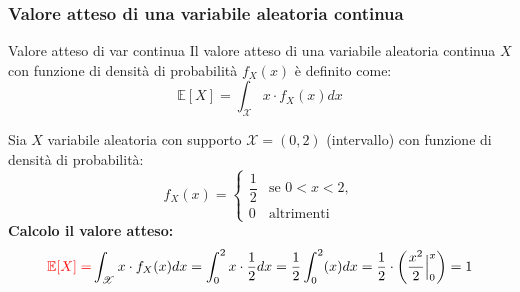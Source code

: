 \documentclass{article}  %
\theoremstyle{definition}
\begin{document}
\subsubsection{Valore atteso di una variabile aleatoria continua}
\begin{theorem}{Valore atteso di var continua}
	Il valore atteso di una variabile aleatoria continua $X$ con funzione di densità di probabilità $f_X(x)$ è definito come:
	\[
		\mathbb{E}[X]=\int_{\mathscr{X}}x \cdot f_X(x)dx
	\]
\end{theorem}
\begin{esercizio}[Esercizio]
	Sia $X$ variabile aleatoria con supporto $\mathscr{X}=(0,2)$ (intervallo) con funzione di densità di probabilità:
	\[
		f_X(x) =
		\begin{cases}
			\dfrac{1}{2} & \text{se } 0 < x < 2, \\[2mm]
			0            & \text{altrimenti}
		\end{cases}
	\]
	\textbf{Calcolo il valore atteso:}
	\[
		\textcolor{red}{\mathbb{E}[X]=}\int_{\mathscr{X}}x \cdot f_X(x)dx=\int_{0}^{2}x \cdot \frac{1}{2}dx=\frac{1}{2}\int_{0}^{2}(x)dx=\frac{1}{2}\cdot\left( \frac{x^2}{2}\Big|_{0}^{x} \right)=1
	\]
\end{esercizio}
\end{document}
